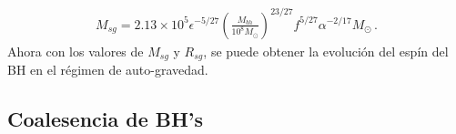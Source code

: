 %
\begin{align}
    M_{sg} = 2.13\times 10^{5}\epsilon^{-5/27}\left(\frac{M_{bh}}{10^{8}M_{\odot}} \right)^{23/27}f^{5/27}\alpha^{-2/17}M_{\odot}\,.
\end{align}
%
Ahora con los valores de $M_{sg}$ y $R_{sg}$, se puede obtener la evolución del espín del BH en el régimen de auto-gravedad.


\subsection{Coalesencia de BH's}
\label{subsec: Acrecion_gas}




